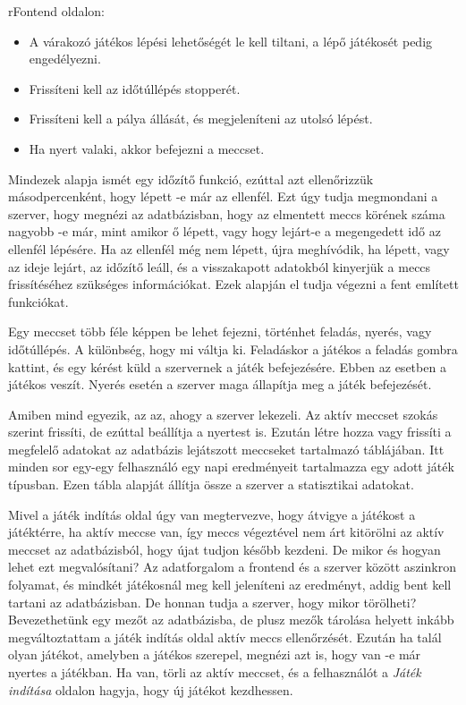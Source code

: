 rFontend oldalon:
\begin{itemize}
	\item A várakozó játékos lépési lehetőségét le kell tiltani, a lépő játékosét pedig engedélyezni.
	\item Frissíteni kell az időtúllépés stopperét.
	\item Frissíteni kell a pálya állását, és megjeleníteni az utolsó lépést.
	\item Ha nyert valaki, akkor befejezni a meccset.
\end{itemize}

Mindezek alapja ismét egy időzítő funkció, ezúttal azt ellenőrizzük másodpercenként, hogy lépett -e már az ellenfél. Ezt úgy tudja megmondani a szerver, hogy megnézi az adatbázisban, hogy az elmentett meccs körének száma nagyobb -e már, mint amikor ő lépett, vagy hogy lejárt-e a megengedett idő az ellenfél lépésére. Ha az ellenfél még nem lépett, újra meghívódik, ha lépett, vagy az ideje lejárt, az időzítő leáll, és a visszakapott adatokból kinyerjük a meccs frissítéséhez szükséges információkat. Ezek alapján el tudja végezni a fent említett funkciókat.

Egy meccset több féle képpen be lehet fejezni, történhet feladás, nyerés, vagy időtúllépés. A különbség, hogy mi váltja ki. Feladáskor a játékos a feladás gombra kattint, és egy kérést küld a szervernek a játék befejezésére. Ebben az esetben a játékos veszít. Nyerés esetén a szerver maga állapítja meg a játék befejezését.

Amiben mind egyezik, az az, ahogy a szerver lekezeli. Az aktív meccset szokás szerint frissíti, de ezúttal beállítja a nyertest is. Ezután létre hozza vagy frissíti a megfelelő adatokat az adatbázis lejátszott meccseket tartalmazó táblájában. Itt minden sor egy-egy felhasználó egy napi eredményeit tartalmazza egy adott játék típusban. Ezen tábla alapját állítja össze a szerver a statisztikai adatokat.

Mivel a játék indítás oldal úgy van megtervezve, hogy átvigye a játékost a játéktérre, ha aktív meccse van, így meccs végeztével nem árt kitörölni az aktív meccset az adatbázisból, hogy újat tudjon később kezdeni. De mikor és hogyan lehet ezt megvalósítani? Az adatforgalom a frontend és a szerver között aszinkron folyamat, és mindkét játékosnál meg kell jeleníteni az eredményt, addig bent kell tartani az adatbázisban. De honnan tudja a szerver, hogy mikor törölheti? Bevezethetünk egy mezőt az adatbázisba, de plusz mezők tárolása helyett inkább megváltoztattam a játék indítás oldal aktív meccs ellenőrzését. Ezután ha talál olyan játékot, amelyben a játékos szerepel, megnézi azt is, hogy van -e már nyertes a játékban. Ha van, törli az aktív meccset, és a felhasználót a \textit{Játék indítása} oldalon hagyja, hogy új játékot kezdhessen.


